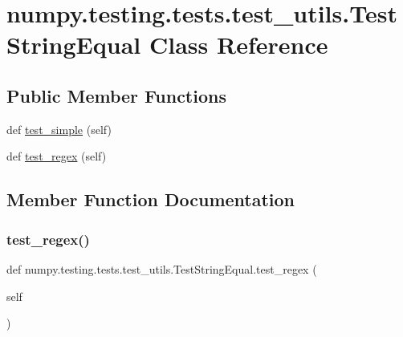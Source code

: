 \hypertarget{classnumpy_1_1testing_1_1tests_1_1test__utils_1_1TestStringEqual}{}\section{numpy.\+testing.\+tests.\+test\+\_\+utils.\+Test\+String\+Equal Class Reference}
\label{classnumpy_1_1testing_1_1tests_1_1test__utils_1_1TestStringEqual}
\subsection*{Public Member Functions}
\begin{DoxyCompactItemize}
\item 
def \hyperlink{classnumpy_1_1testing_1_1tests_1_1test__utils_1_1TestStringEqual_ace8c309cec9a314ef3c97b2fa29c4164}{test\+\_\+simple} (self)
\item 
def \hyperlink{classnumpy_1_1testing_1_1tests_1_1test__utils_1_1TestStringEqual_ab03067ead8a8fdf8769b7fef160e0069}{test\+\_\+regex} (self)
\end{DoxyCompactItemize}


\subsection{Member Function Documentation}
\mbox{\label{classnumpy_1_1testing_1_1tests_1_1test__utils_1_1TestStringEqual_ab03067ead8a8fdf8769b7fef160e0069}} 
\subsubsection{\texorpdfstring{test\+\_\+regex()}{test\_regex()}}
{\footnotesize\ttfamily def numpy.\+testing.\+tests.\+test\+\_\+utils.\+Test\+String\+Equal.\+test\+\_\+regex (\begin{DoxyParamCaption}\item[{}]{self }\end{DoxyParamCaption})}

